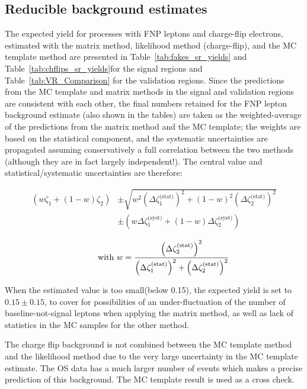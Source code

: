 \subsection*{Reducible background estimates}

The expected yield for processes with FNP leptons and charge-flip electrons, 
estimated with the matrix method, likelihood method (charge-flip), and the MC template method 
are presented in Table~\ref{tab:fakes_sr_yields} and Table~\ref{tab:chflips_sr_yields}for the signal regions and Table~\ref{tab:VR_Comparison} for the validation regions. 
Since the predictions from the MC template and matrix methods in the signal and validation regions are consistent 
with each other, 
the final numbers retained for the FNP lepton background estimate (also shown in the tables) 
are taken as the weighted-average of the predictions from the matrix method and the MC template; 
the weights are based on the statistical component, and the systematic uncertainties are propagated 
assuming conservatively a full correlation between the two methods (although they are in fact largely independent!). 
The central value and statistical/systematic uncertainties are therefore: 

\begin{equation}
\begin{aligned}
\left(w\zeta_1 + (1-w)\zeta_2\right) 
& \pm \sqrt{w^2\left(\Delta\zeta_1^\text{(stat)}\right)^2 + (1-w)^2\left(\Delta\zeta_2^\text{(stat)}\right)^2} \\
& \pm \left(w\Delta\zeta_1^\text{(syst)} + (1-w)\Delta\zeta_2^\text{(syst)}\right)
\end{aligned}
\end{equation}

$$\qquad\text{ with }w=\frac{\left(\Delta\zeta_2^\text{(stat)}\right)^2}{\left(\Delta\zeta_1^\text{(stat)}\right)^2+\left(\Delta\zeta_2^\text{(stat)}\right)^2}\notag$$

When the estimated value is too small(below 0.15), the expected yield is set to $0.15\pm 0.15$, 
to cover for possibilities of an under-fluctuation of the number of baseline-not-signal leptons 
when applying the matrix method, as well as lack of statistics in the MC samples for the other method. 

The charge flip background is not combined between the MC template method and the likelihood method due to the very large uncertainty in the MC template estimate.
The OS data has a much larger number of events which makes a precise prediction of this background. The MC template result is used as a cross check.

